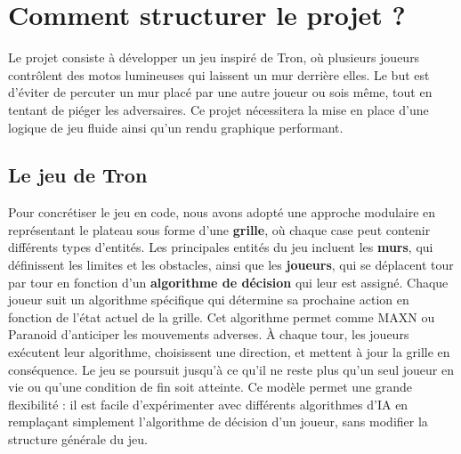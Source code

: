 \section{Comment structurer le projet ?}
Le projet consiste à développer un jeu inspiré de Tron, où plusieurs joueurs contrôlent des motos lumineuses qui laissent un mur derrière elles. Le but est d'éviter de percuter un mur placé par une autre joueur ou sois même, tout en tentant de piéger les adversaires. Ce projet nécessitera la mise en place d’une logique de jeu fluide ainsi qu’un rendu graphique performant.

\subsection{Le jeu de Tron}
Pour concrétiser le jeu en code, nous avons adopté une approche modulaire en représentant le plateau sous forme d’une \textbf{grille}, où chaque case peut contenir différents types d’entités. Les principales entités du jeu incluent les \textbf{murs}, qui définissent les limites et les obstacles, ainsi que les \textbf{joueurs}, qui se déplacent tour par tour en fonction d’un \textbf{algorithme de décision} qui leur est assigné.
Chaque joueur suit un algorithme spécifique qui détermine sa prochaine action en fonction de l’état actuel de la grille. Cet algorithme permet comme MAXN ou Paranoid d’anticiper les mouvements adverses. À chaque tour, les joueurs exécutent leur algorithme, choisissent une direction, et mettent à jour la grille en conséquence. Le jeu se poursuit jusqu’à ce qu’il ne reste plus qu’un seul joueur en vie ou qu’une condition de fin soit atteinte.
Ce modèle permet une grande flexibilité : il est facile d’expérimenter avec différents algorithmes d’IA en remplaçant simplement l’algorithme de décision d’un joueur, sans modifier la structure générale du jeu.

